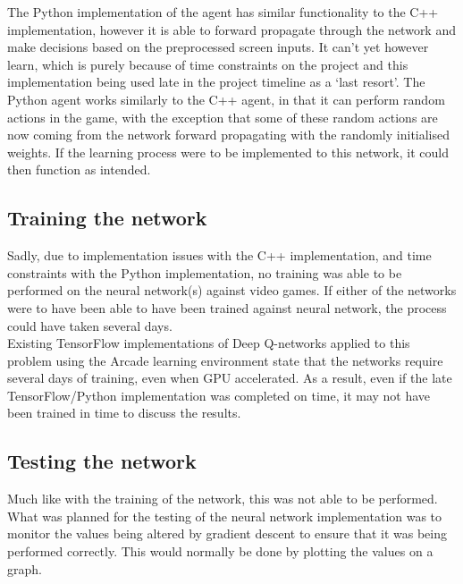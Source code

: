 \documentclass[10pt]{article}
\begin{document}
		The Python implementation of the agent has similar functionality to the C++ implementation, however it is able to forward propagate through the network and make decisions based on the preprocessed screen inputs. It can't yet however learn, which is purely because of time constraints on the project and this implementation being used late in the project timeline as a `last resort'. The Python agent works similarly to the C++ agent, in that it can perform random actions in the game, with the exception that some of these random actions are now coming from the network forward propagating with the randomly initialised weights. If the learning process were to be implemented to this network, it could then function as intended.
	\medskip	
	
	
	\subsection{Training the network}
		Sadly, due to implementation issues with the C++ implementation, and time constraints with the Python implementation, no training was able to be performed on the neural network(s) against video games. If either of the networks were to have been able to have been trained against neural network, the process could have taken several days.\\
		
		Existing TensorFlow implementations of Deep Q-networks applied to this problem using the Arcade learning environment state that the networks require several days of training, even when GPU accelerated. As a result, even if the late TensorFlow/Python implementation was completed on time, it may not have been trained in time to discuss the results.
		
	
	\medskip
	
	\subsection{Testing the network}
		Much like with the training of the network, this was not able to be performed. What was planned for the testing of the neural network implementation was to monitor the values being altered by gradient descent to ensure that it was being performed correctly. This would normally be done by plotting the values on a graph.\\
		
\end{document}
